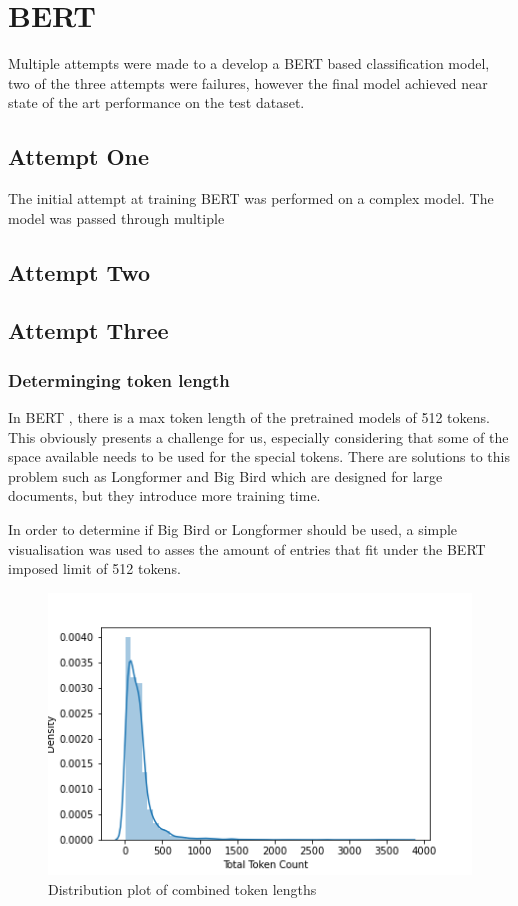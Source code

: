\section{BERT}
Multiple attempts were made to a develop a BERT \cite{devlin_bert} based classification model, two of the three attempts were failures, however the final 
model achieved near state of the art performance on the test dataset. 

\subsection{Attempt One}
The initial attempt at training BERT was performed on a complex model. The model was passed through multiple 


\subsection{Attempt Two}


\subsection{Attempt Three}

\subsubsection{Determinging token length}
In BERT , there is a max token length of the pretrained models of 512 tokens. This obviously presents a challenge for us, especially considering that some 
of the space available needs to be used for the special tokens. There are solutions to this problem such as Longformer and Big Bird which are designed for large documents, 
but they introduce more training time. 

In order to determine if Big Bird or Longformer should be used, a simple visualisation was used  to asses the amount of entries that 
fit under the BERT imposed limit of 512 tokens. 

\begin{figure}[ht]
  \centering
  \includegraphics[width=\columnwidth]{total_length_dist}
  \caption{Distribution plot of combined token lengths}
  \label{fig:tdist}
\end{figure}


